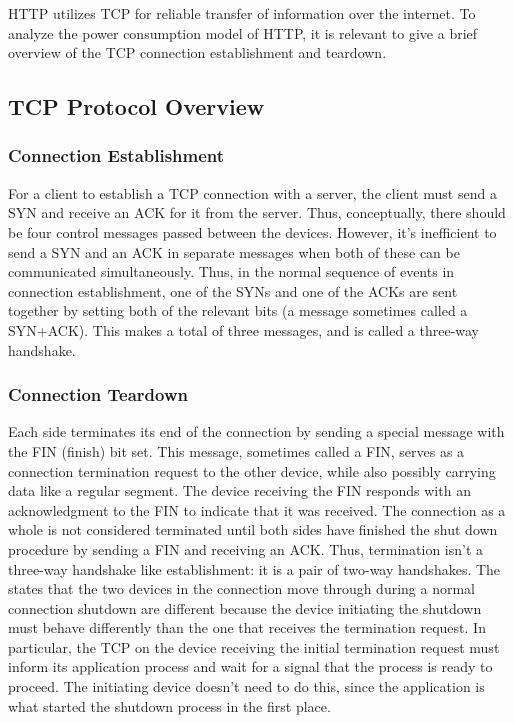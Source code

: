 \documentclass{sigplanconf}
\begin{document}
HTTP utilizes TCP for reliable transfer of information over the internet. To analyze the power consumption model of HTTP, it is relevant to give a brief overview of the TCP connection establishment and teardown.

\subsection{TCP Protocol Overview}

\subsubsection{Connection Establishment}

For a client to establish a TCP connection with a server, the client must send a SYN and receive an ACK for it from the server. Thus, conceptually, there should be four control messages passed between the devices. However, it's inefficient to send a SYN and an ACK in separate messages when both of these can be communicated simultaneously. Thus, in the normal sequence of events in connection establishment, one of the SYNs and one of the ACKs are sent together by setting both of the relevant bits (a message sometimes called a SYN+ACK). This makes a total of three messages, and is called a three-way handshake.

\subsubsection{Connection Teardown}
Each side terminates its end of the connection by sending a special message with the FIN (finish) bit set. This message, sometimes called a FIN, serves as a connection termination request to the other device, while also possibly carrying data like a regular segment. The device receiving the FIN responds with an acknowledgment to the FIN to indicate that it was received. The connection as a whole is not considered terminated until both sides have finished the shut down procedure by sending a FIN and receiving an ACK.
Thus, termination isn't a three-way handshake like establishment: it is a pair of two-way handshakes. The states that the two devices in the connection move through during a normal connection shutdown are different because the device initiating the shutdown must behave differently than the one that receives the termination request. In particular, the TCP on the device receiving the initial termination request must inform its application process and wait for a signal that the process is ready to proceed. The initiating device doesn't need to do this, since the application is what started the shutdown process in the first place.
\end{document}
